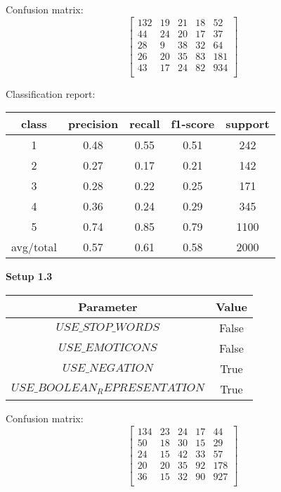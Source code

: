 \documentclass[12pt]{report}
\begin{document}
Confusion matrix:
\[
\begin{bmatrix}
132 & 19 & 21 & 18 & 52 \\
44 & 24 & 20 & 17 & 37 \\
28 &  9 & 38 & 32 & 64 \\
26 & 20 & 35 & 83 & 181 \\
43 & 17 & 24 & 82 & 934 \\
\end{bmatrix}
\]

Classification report:

\begin{center}
	\begin{tabular}{c | c | c | c | c }
		\hline
		class & precision & recall & f1-score & support \\ \hline
		1 & 0.48 & 0.55 & 0.51 & 242 \\ \hline
		2 & 0.27 & 0.17 & 0.21 & 142 \\ \hline
		3 & 0.28 & 0.22 & 0.25 & 171 \\ \hline
		4 & 0.36 & 0.24 & 0.29 & 345 \\ \hline
		5 & 0.74 & 0.85 & 0.79 & 1100 \\ \hline
		avg/total & 0.57 & 0.61 & 0.58 & 2000 \\ \hline
	\end{tabular}
\end{center}


\textbf{Setup 1.3}

\begin{center}
	\begin{tabular}{ c | c }
		\hline
		Parameter & Value \\ \hline
		$USE\_STOP\_WORDS$ & False \\ \hline
		$USE\_EMOTICONS$ & False \\ \hline
		$USE\_NEGATION$ & True \\ \hline
		$USE\_BOOLEAN_REPRESENTATION$ & True \\ \hline
	\end{tabular}
\end{center}

Confusion matrix:
\[
\begin{bmatrix}
134 & 23 & 24 & 17 & 44 \\
50 & 18 & 30 & 15 & 29 \\
24 & 15 & 42 & 33 & 57 \\
20 & 20 & 35 & 92 & 178 \\
36 & 15 & 32 & 90 & 927 \\
\end{bmatrix}
\]
\end{document}
